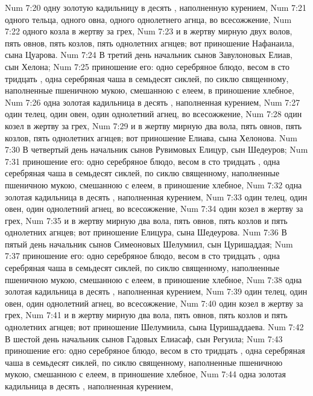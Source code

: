 \vs Num 7:20 одну золотую кадильницу в десять , наполненную курением,
\vs Num 7:21 одного тельца, одного овна, одного однолетнего агнца, во всесожжение,
\vs Num 7:22 одного козла в жертву за грех,
\vs Num 7:23 и в жертву мирную двух волов, пять овнов, пять козлов, пять однолетних агнцев; вот приношение Нафанаила, сына Цуарова.
\vs Num 7:24 В третий день начальник сынов Завулоновых Елиав, сын Хелона;
\vs Num 7:25 приношение его: одно серебряное блюдо, весом в сто тридцать , одна серебряная чаша в семьдесят сиклей, по сиклю священному, наполненные пшеничною мукою, смешанною с елеем, в приношение хлебное,
\vs Num 7:26 одна золотая кадильница в десять , наполненная курением,
\vs Num 7:27 один телец, один овен, один однолетний агнец, во всесожжение,
\vs Num 7:28 один козел в жертву за грех,
\vs Num 7:29 и в жертву мирную два вола, пять овнов, пять козлов, пять однолетних агнцев; вот приношение Елиава, сына Хелонова.
\vs Num 7:30 В четвертый день начальник сынов Рувимовых Елицур, сын Шедеуров;
\vs Num 7:31 приношение его: одно серебряное блюдо, весом в сто тридцать , одна серебряная чаша в семьдесят сиклей, по сиклю священному, наполненные пшеничною мукою, смешанною с елеем, в приношение хлебное,
\vs Num 7:32 одна золотая кадильница в десять , наполненная курением,
\vs Num 7:33 один телец, один овен, один однолетний агнец, во всесожжение,
\vs Num 7:34 один козел в жертву за грех,
\vs Num 7:35 и в жертву мирную два вола, пять овнов, пять козлов и пять однолетних агнцев; вот приношение Елицура, сына Шедеурова.
\vs Num 7:36 В пятый день начальник сынов Симеоновых Шелумиил, сын Цуришаддая;
\vs Num 7:37 приношение его: одно серебряное блюдо, весом в сто тридцать , одна серебряная чаша в семьдесят сиклей, по сиклю священному, наполненные пшеничною мукою, смешанною с елеем, в приношение хлебное,
\vs Num 7:38 одна золотая кадильница в десять , наполненная курением,
\vs Num 7:39 один телец, один овен, один однолетний агнец, во всесожжение,
\vs Num 7:40 один козел в жертву за грех,
\vs Num 7:41 и в жертву мирную два вола, пять овнов, пять козлов и пять однолетних агнцев; вот приношение Шелумиила, сына Цуришаддаева.
\vs Num 7:42 В шестой день начальник сынов Гадовых Елиасаф, сын Регуила;
\vs Num 7:43 приношение его: одно серебряное блюдо, весом в сто тридцать , одна серебряная чаша в семьдесят сиклей, по сиклю священному, наполненные пшеничною мукою, смешанною с елеем, в приношение хлебное,
\vs Num 7:44 одна золотая кадильница в десять , наполненная курением,
